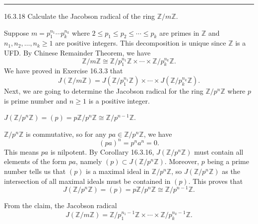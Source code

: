 \documentclass[a4paper, 12pt]{article}
\begin{document}
\noindent\rule{7in}{2.8pt}
\begin{problem}{16.3.18}
Calculate the Jacobson radical of the ring \(\mathbb{Z}/ m \mathbb{Z}\).
\end{problem}
\begin{solution}
Suppose \(m=p_1^{n_1}\cdots p_k^{n_k}\) where \(2\leq p_1\leq p_2\leq \cdots\leq p_k\) are primes in \(\mathbb{Z}\) and \(n_1,n_2,\ldots,n_k\geq 1\) are positive integers. This decomposition is unique since \(\mathbb{Z}\) is a UFD. By 
Chinese Remainder Theorem, we have 
\[\mathbb{Z}/m \mathbb{Z}\cong \mathbb{Z}/p_1^{n_1} \mathbb{Z}\times \cdots\times \mathbb{Z}/p_k^{n_k}\mathbb{Z}.\]
We have proved in Exercise 16.3.3 that 
\[J(\mathbb{Z}/m \mathbb{Z})=J(\mathbb{Z}/p_1^{n_1}\mathbb{Z})\times \cdots\times J(\mathbb{Z}/p_k^{n_k} \mathbb{Z}).\]
Next, we are going to determine the Jacobson radical for the ring \(\mathbb{Z}/p^n \mathbb{Z}\) where \(p\) is prime number and \(n\geq 1\) is a positive integer. 
\begin{claim}
\(J(\mathbb{Z}/p^n \mathbb{Z})=(p)=p \mathbb{Z}/p^n \mathbb{Z}\cong \mathbb{Z}/p^{n-1}\mathbb{Z}\).
\end{claim}
\begin{claimproof}
\(\mathbb{Z}/p^n \mathbb{Z}\) is commutative, so for any \(pa\in \mathbb{Z}/p^n \mathbb{Z}\), we have 
\[(pa)^n=p^na^n=0.\]
This means \(pa\) is nilpotent. By Corollary 16.3.16, \(J(\mathbb{Z}/p^n \mathbb{Z})\) must contain all elements of the form \(pa\), namely \((p)\subset J(\mathbb{Z}/p^n \mathbb{Z})\). Moreover, \(p\) being a prime number tells us that 
\((p)\) is a maximal ideal in \(\mathbb{Z}/p^n \mathbb{Z}\), so \(J(\mathbb{Z}/p^n \mathbb{Z})\) as the intersection of all maximal ideals must be contained in \((p)\). This proves that 
 \[J(\mathbb{Z}/p^n \mathbb{Z})=(p)=p \mathbb{Z}/p^n \mathbb{Z}\cong \mathbb{Z}/p^{n-1}\mathbb{Z}.\]
\end{claimproof}

From the claim, the Jacobson radical 
\[J(\mathbb{Z}/m \mathbb{Z})=\mathbb{Z}/p_1^{n_1-1}\mathbb{Z}\times \cdots\times \mathbb{Z}/p_k^{n_k-1}\mathbb{Z}.\]
\end{solution}
\end{document}
